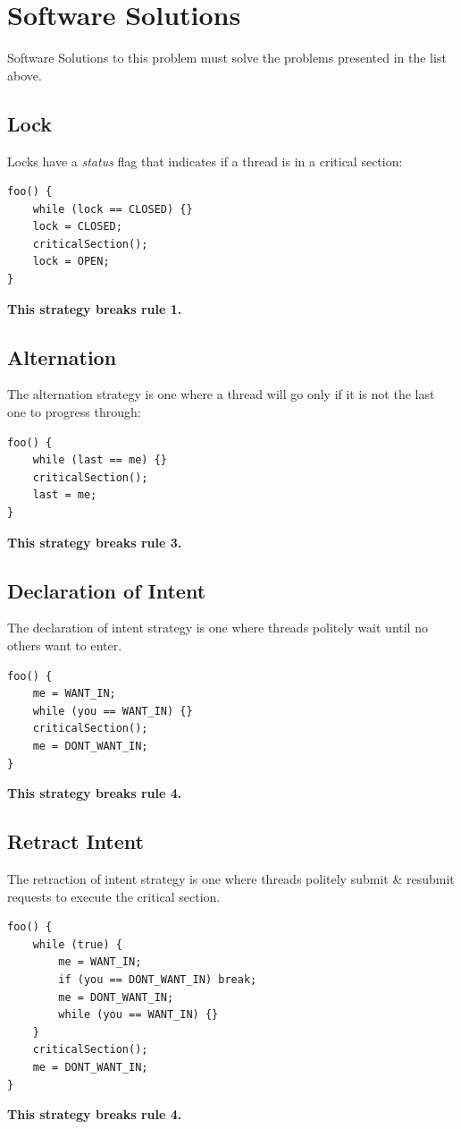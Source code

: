         \section{Software Solutions} %
        \label{sec:software_solutions}
            Software Solutions to this problem must solve the problems presented in the list above.
            \subsection{Lock} %
            \label{sub:lock}
                Locks have a \textit{status} flag that indicates if a thread is in a critical section:
                \begin{lstlisting}
foo() {
    while (lock == CLOSED) {}
    lock = CLOSED;
    criticalSection();
    lock = OPEN;
}
                \end{lstlisting}
                \textbf{This strategy breaks rule 1.}
            \subsection{Alternation} %
            \label{sub:alternation}
                The alternation strategy is one where a thread will go only if it is not the last one to progress through:
                \begin{lstlisting}
foo() {
    while (last == me) {}
    criticalSection();
    last = me;
}
                \end{lstlisting}
                \textbf{This strategy breaks rule 3.}
            \subsection{Declaration of Intent} %
            \label{sub:declaration_of_intent}
                The declaration of intent strategy is one where threads politely wait until no others want to enter.
                \begin{lstlisting}
foo() {
    me = WANT_IN;
    while (you == WANT_IN) {}
    criticalSection();
    me = DONT_WANT_IN;
}
                \end{lstlisting}
                \textbf{This strategy breaks rule 4.}
            \subsection{Retract Intent} %
            \label{sub:retract_intent}
                The retraction of intent strategy is one where threads politely submit \& resubmit requests to execute the critical section.
                \begin{lstlisting}
foo() {
    while (true) {
        me = WANT_IN;
        if (you == DONT_WANT_IN) break;
        me = DONT_WANT_IN;
        while (you == WANT_IN) {}
    }
    criticalSection();
    me = DONT_WANT_IN;
}
                \end{lstlisting}
                \textbf{This strategy breaks rule 4.}
